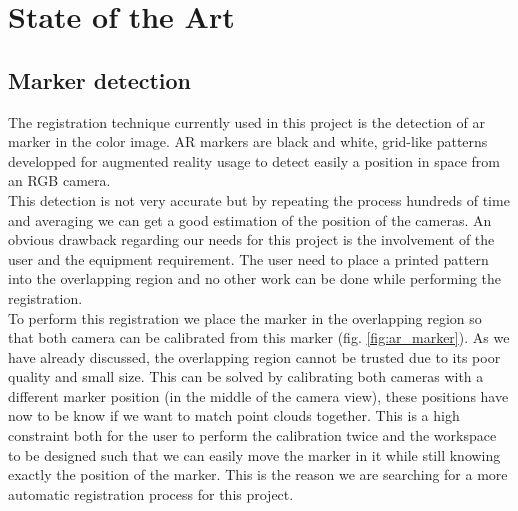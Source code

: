 
\chapter{State of the Art}


\section{Marker detection}

The registration technique currently used in this project is the detection of \acrshort{ar} marker in the color image. AR markers are black and white, grid-like patterns developped for augmented reality usage to detect easily a position in space from an RGB camera. \\
This detection is not very accurate but by repeating the process hundreds of time and averaging we can get a good estimation of the position of the cameras. An obvious drawback regarding our needs for this project is the involvement of the user and the equipment requirement. The user need to place a printed pattern into the overlapping region and no other work can be done while performing the registration. \\
To perform this registration we place the marker in the overlapping region so that both camera can be calibrated from this marker (fig. \ref{fig:ar_marker}). As we have already discussed, the overlapping region cannot be trusted due to its poor quality and small size. This can be solved by calibrating both cameras with a different marker position (in the middle of the camera view), these positions have now to be know if we want to match point clouds together. This is a high constraint both for the user to perform the calibration twice and the workspace to be designed such that we can easily move the marker in it while still knowing exactly the position of the marker. This is the reason we are searching for a more automatic registration process for this project. \\

